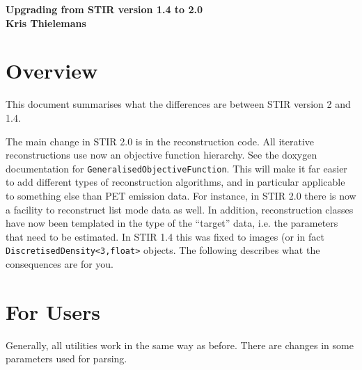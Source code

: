 \documentclass{article}
\begin{document}
\begin{center}
\begin{spacing}{1.5}
\textbf{{\huge Upgrading from STIR version 1.4 to 2.0}}\\
\textbf{Kris Thielemans}
\end{spacing}
\end{center}

\tableofcontents 

\section{Overview}
This document summarises what the differences are
between STIR version 2 and 1.4.

The main change in STIR 2.0 is in the reconstruction code. 
All iterative reconstructions use now an objective function hierarchy. See 
the doxygen documentation for \texttt{GeneralisedObjectiveFunction}. This
will make it far easier to add different types of reconstruction 
algorithms, and in particular applicable to something else than PET
emission data. For instance, in STIR 2.0 there is now a facility to reconstruct
list mode data as well. In addition, reconstruction classes have now been
templated in the type of the ``target'' data, i.e. the parameters that 
need to be estimated. In STIR 1.4 this was fixed to images
(or in fact \texttt{DiscretisedDensity<3,float>} objects. 
The following describes what the consequences are for you.

\section{For Users}
Generally, all utilities work in the same way as before. There are
changes in some parameters used for parsing.
\end{document}
